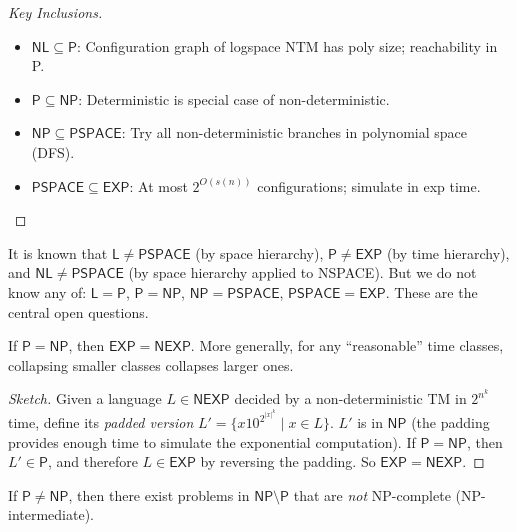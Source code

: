 \begin{proof}[Key Inclusions]
\begin{itemize}
\item $\mathsf{NL} \subseteq \mathsf{P}$: Configuration graph of logspace NTM has poly size; reachability in P.
\item $\mathsf{P} \subseteq \mathsf{NP}$: Deterministic is special case of non-deterministic.
\item $\mathsf{NP} \subseteq \mathsf{PSPACE}$: Try all non-deterministic branches in polynomial space (DFS).
\item $\mathsf{PSPACE} \subseteq \mathsf{EXP}$: At most $2^{O(s(n))}$ configurations; simulate in exp time.
\end{itemize}
\end{proof}

\begin{remark}
It is known that $\mathsf{L} \neq \mathsf{PSPACE}$ (by space hierarchy), $\mathsf{P} \neq \mathsf{EXP}$ (by time hierarchy), and $\mathsf{NL} \neq \mathsf{PSPACE}$ (by space hierarchy applied to NSPACE). But we do not know any of: $\mathsf{L} = \mathsf{P}$, $\mathsf{P} = \mathsf{NP}$, $\mathsf{NP} = \mathsf{PSPACE}$, $\mathsf{PSPACE} = \mathsf{EXP}$. These are the central open questions.
\end{remark}

\begin{theorem}
If $\mathsf{P} = \mathsf{NP}$, then $\mathsf{EXP} = \mathsf{NEXP}$. More generally, for any ``reasonable'' time classes, collapsing smaller classes collapses larger ones.
\end{theorem}

\begin{proof}[Sketch]
Given a language $L \in \mathsf{NEXP}$ decided by a non-deterministic TM in $2^{n^k}$ time, define its \emph{padded version} $L' = \{ x10^{2^{|x|^k}} \mid x \in L \}$. $L'$ is in $\mathsf{NP}$ (the padding provides enough time to simulate the exponential computation). If $\mathsf{P} = \mathsf{NP}$, then $L' \in \mathsf{P}$, and therefore $L \in \mathsf{EXP}$ by reversing the padding. So $\mathsf{EXP} = \mathsf{NEXP}$.
\end{proof}

\begin{theorem}
If $\mathsf{P} \neq \mathsf{NP}$, then there exist problems in $\mathsf{NP} \setminus \mathsf{P}$ that are \emph{not} NP-complete (NP-intermediate).
\end{theorem}

